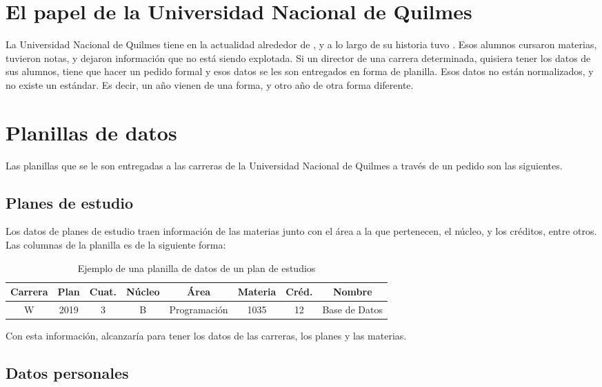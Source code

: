 \section[El papel de la Universidad Nacional de Quilmes]{El papel de la Universidad Nacional de Quilmes}

La Universidad Nacional de Quilmes tiene en la actualidad alrededor de , y a lo largo de su historia tuvo . Esos alumnos cursaron materias, tuvieron notas, y dejaron información que no está siendo explotada.
Si un director de una carrera determinada, quisiera tener los datos de sus alumnos, tiene que hacer un pedido formal y esos datos se les son entregados en forma de planilla. Esos datos no están normalizados, y no existe un estándar. Es decir, un año vienen de una forma, y otro año de otra forma diferente.

\section[Planillas de datos]{Planillas de datos}

Las planillas que se le son entregadas a las carreras de la Universidad Nacional de Quilmes a través de un pedido son las siguientes.

\subsection[Planes de estudio]{Planes de estudio}

Los datos de planes de estudio traen información de las materias junto con el área a la que pertenecen, el núcleo, y los créditos, entre otros.
Las columnas de la planilla es de la siguiente forma:

\begin{table}[]
    \centering
    \begin{tabular}{|c|c|c|c|c|c|c|c|}
    \hline
    Carrera & Plan & Cuat. & Núcleo & Área & Materia & Créd. & Nombre \\ \hline
    W & 2019 & 3 & B & Programación & 1035 & 12 & Base de Datos  \\
    \hline
    \end{tabular}
    \caption{Ejemplo de una planilla de datos de un plan de estudios}
    \label{tab:tabla_planes}
\end{table}

Con esta información, alcanzaría para tener los datos de las carreras, los planes y las materias.

\subsection[Datos personales]{Datos personales}

